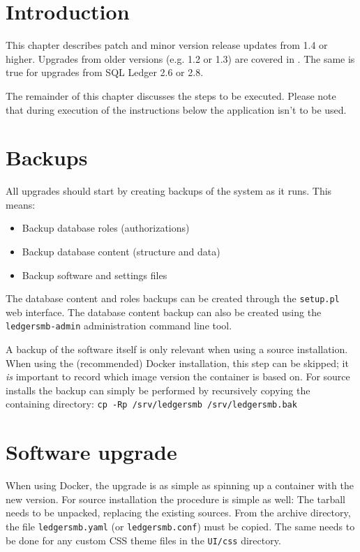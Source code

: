 \section{Introduction}
\label{sec-updates-introduction}

This chapter describes patch and minor version release updates from 1.4 or higher.
Upgrades from older versions (e.g. 1.2 or 1.3) are covered in .
The same is true for upgrades from SQL Ledger 2.6 or 2.8.

The remainder of this chapter discusses the steps to be executed. Please note that during execution of the instructions below the application isn't to be used.

\section{Backups}
\label{sec-updates-backups}

All upgrades should start by creating backups  of the system as it runs.  This means:

\begin{itemize}
\item Backup database roles (authorizations)
\item Backup database content (structure and data)
\item Backup software and settings files
\end{itemize}

The database content and roles backups can be created through the \texttt{setup.pl} web interface.
The database content backup can also be created using the \texttt{ledgersmb-admin} administration
command line tool.

A backup of the software itself is only relevant when using a source installation. When using
the (recommended) Docker installation, this step can be skipped; it \textit{is} important to
record which image version the container is based on. For source installs the backup can simply
be performed by recursively copying the containing directory: 
\texttt{cp -Rp /srv/ledgersmb /srv/ledgersmb.bak}

\section{Software upgrade}
\label{sec-updates-software-upgrades}

When using Docker, the upgrade is as simple as spinning up a container with the new version.
For source installation the procedure is simple as well: The tarball needs to be unpacked,
replacing the existing sources.  From the archive directory, the file \texttt{ledgersmb.yaml}
(or \texttt{ledgersmb.conf}) must be copied.  The same needs to be done for any custom CSS
theme files in the \texttt{UI/css} directory.

